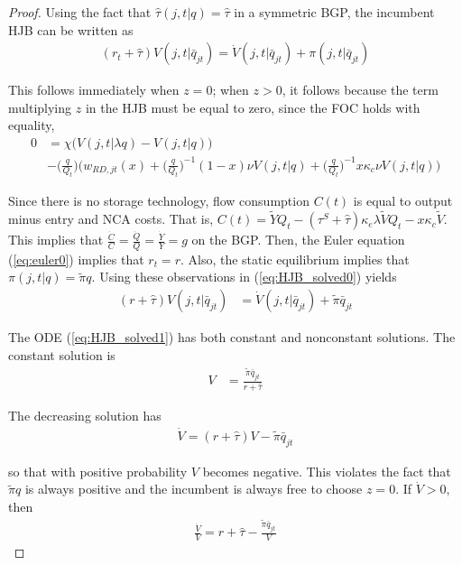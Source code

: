 \documentclass[11pt,english]{article}
\begin{document}
\begin{proof}
	 Using the fact that $\hat{\tau}(j,t|q) = \hat{\tau}$ in a symmetric BGP, the incumbent HJB can be written as
	\begin{align}
	(r_t + \hat{\tau}) V(j,t|\bar{q}_{jt}) = \dot{V}(j,t|\bar{q}_{jt}) + \pi(j,t|\bar{q}_{jt}) \label{eq:HJB_solved0}
	\end{align}
	
	This follows immediately when $z = 0$; when $z > 0$, it follows because the term multiplying $z$ in the HJB must be equal to zero, since the FOC holds with equality,
	\begin{align}
	0 &= \chi \big( V(j,t|\lambda q) - V(j,t|q)\big)  \nonumber \\
	&- \big(\frac{q}{Q_t}\big) \Big( w_{RD,jt}(x) + \big(\frac{q}{Q_t}\big)^{-1} (1-x) \nu V(j,t|q) + \big(\frac{q}{Q_t}\big)^{-1}  x \kappa_c \nu V(j,t|q) \Big)
	\end{align} 
	
	Since there is no storage technology, flow consumption $C(t)$ is equal to output minus entry and NCA costs. That is, $C(t) = \tilde{Y}Q_t - (\tau^S + \hat{\tau}) \kappa_e \lambda \tilde{V} Q_t - x \kappa_c \tilde{V}$. This implies that $\frac{\dot{C}}{C} = \frac{\dot{Q}}{Q} = \frac{\dot{Y}}{Y} = g$ on the BGP. Then, the Euler equation (\ref{eq:euler0}) implies that $r_t = r$. Also, the static equilibrium implies that $\pi(j,t|q) = \tilde{\pi} q$. Using these observations in (\ref{eq:HJB_solved0}) yields
	\begin{align}
	(r + \hat{\tau}) V(j,t|\bar{q}_{jt}) &= \dot{V}(j,t|\bar{q}_{jt}) + \tilde{\pi}\bar{q}_{jt} \label{eq:HJB_solved1}
	\end{align}
	
	The ODE (\ref{eq:HJB_solved1}) has both constant and nonconstant solutions. The constant solution is 
	\begin{align}
	V &= \frac{\tilde{\pi} \bar{q}_{jt}}{r + \hat{\tau}} \label{eq:HJB_constant_solution}
	\end{align}
	
	The decreasing solution has 
	\begin{align}
	\dot{V} = (r + \hat{\tau})V - \tilde{\pi}\bar{q}_{jt}
	\end{align}
	
	so that with positive probability $V$ becomes negative. This violates the fact that $\tilde{\pi} q$ is always positive and the incumbent is always free to choose $z = 0$. If $\dot{V} > 0$, then
	\begin{align}
	\frac{\dot{V}}{V} = r + \hat{\tau} - \frac{\tilde{\pi}\bar{q}_{jt}}{V}
	\end{align}
	

\end{proof}
\end{document}
